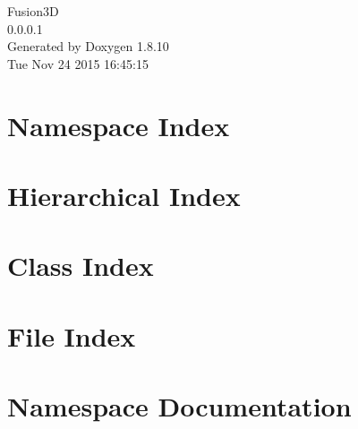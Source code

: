 \documentclass[twoside]{book}
\newcommand{\+}{\discretionary{\mbox{\scriptsize$\hookleftarrow$}}{}{}}
\newcommand{\clearemptydoublepage}{%
  \newpage{\pagestyle{empty}\cleardoublepage}%
}
\begin{document}
\hypersetup{pageanchor=false,
             bookmarks=true,
             bookmarksnumbered=true,
             pdfencoding=unicode
            }
\begin{titlepage}
\vspace*{7cm}
\begin{center}%
{\Large Fusion3\+D \\[1ex]\large 0.\+0.\+0.\+1 }\\
\vspace*{1cm}
{\large Generated by Doxygen 1.8.10}\\
\vspace*{0.5cm}
{\small Tue Nov 24 2015 16:45:15}\\
\end{center}
\end{titlepage}
\clearemptydoublepage
\tableofcontents
\clearemptydoublepage
{}
\hypersetup{pageanchor=true}

\chapter{Namespace Index}

\chapter{Hierarchical Index}

\chapter{Class Index}

\chapter{File Index}

\chapter{Namespace Documentation}



\end{document}
